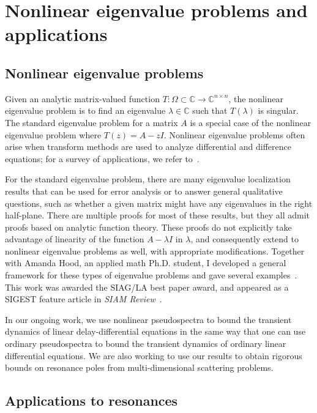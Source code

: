 \documentclass{amsart}
\newcommand{\bbC}{\mathbb{C}}
\begin{document}


\section{Nonlinear eigenvalue problems and applications}
\label{sec-nep}

\subsection*{Nonlinear eigenvalue problems}
Given an analytic matrix-valued function
$T : \Omega \subset \bbC \rightarrow \bbC^{n \times n}$,
the nonlinear eigenvalue problem is to find an eigenvalue
$\lambda \in \bbC$ such that $T(\lambda)$ is singular.
The standard eigenvalue problem for a matrix $A$
is a special case of the nonlinear eigenvalue problem where
$T(z) = A-zI$.  Nonlinear eigenvalue problems often arise
when transform methods are used to analyze differential and
difference equations; for a survey of applications, we refer to~\cite{2015-sirev}.

For the standard eigenvalue problem, there
are many eigenvalue localization results that can be used for error
analysis or to answer general qualitative questions, such as whether a
given matrix might have any eigenvalues in the right half-plane.  There
are multiple proofs for most of these results, but they all admit proofs
based on analytic function theory.  These proofs do not explicitly take
advantage of linearity of the function $A-\lambda I$ in $\lambda$, and
consequently extend to nonlinear eigenvalue problems as well, with
appropriate modifications.  Together with Amanda Hood, an applied math
Ph.D. student, I developed a general framework for these types of
eigenvalue problems and gave several examples~\cite{2013-simax}.  This
work was awarded the SIAG/LA best paper award, and appeared as a SIGEST
feature article in {\em SIAM Review}~\cite{2015-sirev}.

In our ongoing work, we use nonlinear pseudospectra to bound the
transient dynamics of linear delay-differential equations in the same
way that one can use ordinary pseudospectra to bound the transient
dynamics of ordinary linear differential equations.  We are also working
to use our results to obtain rigorous bounds on resonance poles from
multi-dimensional scattering problems.

\subsection*{Applications to resonances}
\end{document}

